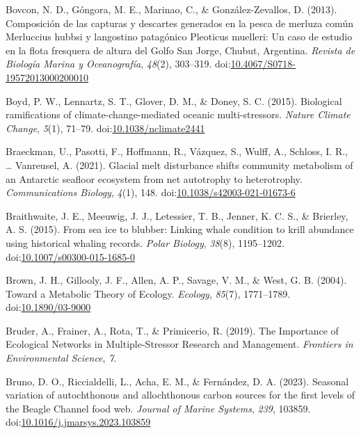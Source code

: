 \documentclass[
]{article}
\newlength{\cslhangindent}
\newlength{\cslentryspacingunit} %
\newenvironment{CSLReferences}[2] %
 {%
  \setlength{\parindent}{0pt}
  \ifodd #1
  \let\oldpar\par
  \def\par{\hangindent=\cslhangindent\oldpar}
  \fi
  \setlength{\parskip}{#2\cslentryspacingunit}
 }%
 {}
\begin{document}
\begin{CSLReferences}{1}{0}
\leavevmode{}%
Bovcon, N. D., Góngora, M. E., Marinao, C., \& González-Zevallos, D.
(2013). Composición de las capturas y descartes generados en la pesca de
merluza común {Merluccius} hubbsi y langostino patagónico {Pleoticus}
muelleri: Un caso de estudio en la flota fresquera de altura del {Golfo
San Jorge}, {Chubut}, {Argentina}. \emph{Revista de Biología Marina y
Oceanografía}, \emph{48}(2), 303--319.
doi:\href{https://doi.org/10.4067/S0718-19572013000200010}{10.4067/S0718-19572013000200010}

\leavevmode{}%
Boyd, P. W., Lennartz, S. T., Glover, D. M., \& Doney, S. C. (2015).
Biological ramifications of climate-change-mediated oceanic
multi-stressors. \emph{Nature Climate Change}, \emph{5}(1), 71--79.
doi:\href{https://doi.org/10.1038/nclimate2441}{10.1038/nclimate2441}

\leavevmode{}%
Braeckman, U., Pasotti, F., Hoffmann, R., Vázquez, S., Wulff, A.,
Schloss, I. R., \ldots{} Vanreusel, A. (2021). Glacial melt disturbance
shifts community metabolism of an {Antarctic} seafloor ecosystem from
net autotrophy to heterotrophy. \emph{Communications Biology},
\emph{4}(1), 148.
doi:\href{https://doi.org/10.1038/s42003-021-01673-6}{10.1038/s42003-021-01673-6}

\leavevmode{}%
Braithwaite, J. E., Meeuwig, J. J., Letessier, T. B., Jenner, K. C. S.,
\& Brierley, A. S. (2015). From sea ice to blubber: Linking whale
condition to krill abundance using historical whaling records.
\emph{Polar Biology}, \emph{38}(8), 1195--1202.
doi:\href{https://doi.org/10.1007/s00300-015-1685-0}{10.1007/s00300-015-1685-0}

\leavevmode{}%
Brown, J. H., Gillooly, J. F., Allen, A. P., Savage, V. M., \& West, G.
B. (2004). Toward a {Metabolic Theory} of {Ecology}. \emph{Ecology},
\emph{85}(7), 1771--1789.
doi:\href{https://doi.org/10.1890/03-9000}{10.1890/03-9000}

\leavevmode{}%
Bruder, A., Frainer, A., Rota, T., \& Primicerio, R. (2019). The
{Importance} of {Ecological Networks} in {Multiple-Stressor Research}
and {Management}. \emph{Frontiers in Environmental Science}, \emph{7}.

\leavevmode{}%
Bruno, D. O., Riccialdelli, L., Acha, E. M., \& Fernández, D. A. (2023).
Seasonal variation of autochthonous and allochthonous carbon sources for
the first levels of the {Beagle Channel} food web. \emph{Journal of
Marine Systems}, \emph{239}, 103859.
doi:\href{https://doi.org/10.1016/j.jmarsys.2023.103859}{10.1016/j.jmarsys.2023.103859}


\end{CSLReferences}
\end{document}
